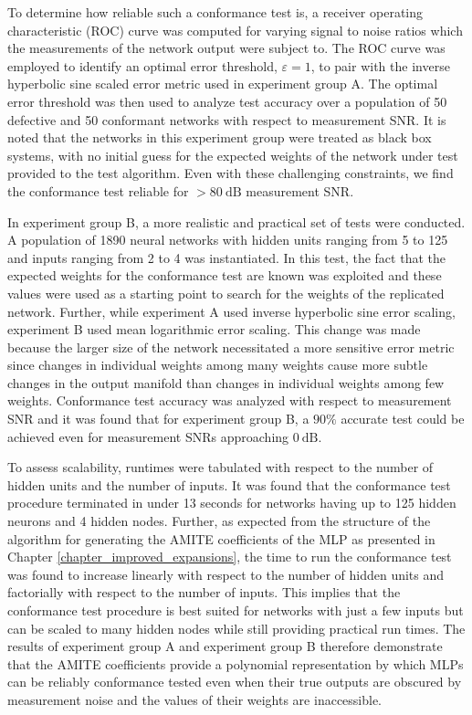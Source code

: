 To determine how reliable such a conformance test is, a receiver operating characteristic (ROC) curve was computed for varying signal to noise ratios which the measurements of the network output were subject to.  The ROC curve was employed to identify an optimal error threshold, $\varepsilon = 1$, to pair with the inverse hyperbolic sine scaled error metric used in experiment group A.  The optimal error threshold was then used to analyze test accuracy over a population of 50 defective and 50 conformant networks with respect to measurement SNR.  It is noted that the networks in this experiment group were treated as black box systems, with no initial guess for the expected weights of the network under test provided to the test algorithm.  Even with these challenging constraints, we find the conformance test reliable for $> 80\ \mathrm{dB}$ measurement SNR.

In experiment group B, a more realistic and practical set of tests were conducted.  A population of 1890 neural networks with hidden units ranging from 5 to 125 and inputs ranging from 2 to 4 was instantiated.  In this test, the fact that the expected weights for the conformance test are known was exploited and these values were used as a starting point to search for the weights of the replicated network.  Further, while experiment A used inverse hyperbolic sine error scaling, experiment B used mean logarithmic error scaling.  This change was made because the larger size of the network necessitated a more sensitive error metric since changes in individual weights among many weights cause more subtle changes in the output manifold than changes in individual weights among few weights.  Conformance test accuracy was analyzed with respect to measurement SNR and it was found that for experiment group B, a $90\%$ accurate test could be achieved even for measurement SNRs approaching $0\ \mathrm{dB}$.

To assess scalability, runtimes were tabulated with respect to the number of hidden units and the number of inputs.  It was found that the conformance test procedure terminated in under 13 seconds for networks having up to 125 hidden neurons and 4 hidden nodes.  Further, as expected from the structure of the algorithm for generating the AMITE coefficients of the MLP as presented in Chapter \ref{chapter_improved_expansions}, the time to run the conformance test was found to increase linearly with respect to the number of hidden units and factorially with respect to the number of inputs.  This implies that the conformance test procedure is best suited for networks with just a few inputs but can be scaled to many hidden nodes while still providing practical run times.  The results of experiment group A and experiment group B therefore demonstrate that the AMITE coefficients provide a polynomial representation by which MLPs can be reliably conformance tested even when their true outputs are obscured by measurement noise and the values of their weights are inaccessible.


